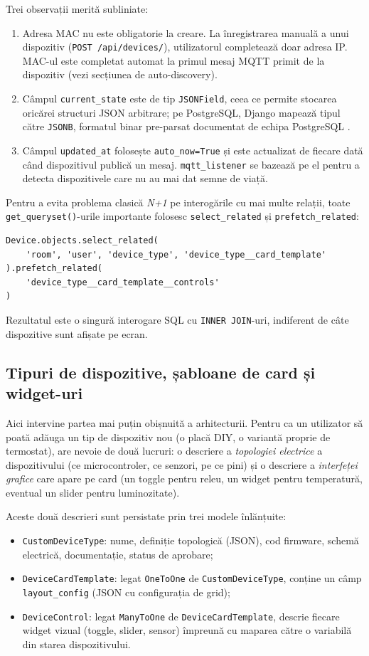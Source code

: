 Trei observații merită subliniate:
\begin{enumerate}
    \item Adresa MAC nu este obligatorie la creare. La înregistrarea manuală a unui dispozitiv (\texttt{POST /api/devices/}), utilizatorul completează doar adresa IP. MAC-ul este completat automat la primul mesaj MQTT primit de la dispozitiv (vezi secțiunea de auto-discovery).
    \item Câmpul \texttt{current\_state} este de tip \texttt{JSONField}, ceea ce permite stocarea oricărei structuri JSON arbitrare; pe PostgreSQL, Django mapează tipul către \texttt{JSONB}, formatul binar pre-parsat documentat de echipa PostgreSQL \cite{postgresql_jsonb_docs}.
    \item Câmpul \texttt{updated\_at} folosește \texttt{auto\_now=True} și este actualizat de fiecare dată când dispozitivul publică un mesaj. \texttt{mqtt\_listener} se bazează pe el pentru a detecta dispozitivele care nu au mai dat semne de viață.
\end{enumerate}

Pentru a evita problema clasică \textit{N+1} pe interogările cu mai multe relații, toate \texttt{get\_queryset()}-urile importante folosesc \texttt{select\_related} și \texttt{prefetch\_related}:
\begin{verbatim}
Device.objects.select_related(
    'room', 'user', 'device_type', 'device_type__card_template'
).prefetch_related(
    'device_type__card_template__controls'
)
\end{verbatim}
Rezultatul este o singură interogare SQL cu \texttt{INNER JOIN}-uri, indiferent de câte dispozitive sunt afișate pe ecran.

\subsection{Tipuri de dispozitive, șabloane de card și widget-uri}
Aici intervine partea mai puțin obișnuită a arhitecturii. Pentru ca un utilizator să poată adăuga un tip de dispozitiv nou (o placă DIY, o variantă proprie de termostat), are nevoie de două lucruri: o descriere a \emph{topologiei electrice} a dispozitivului (ce microcontroler, ce senzori, pe ce pini) și o descriere a \emph{interfeței grafice} care apare pe card (un toggle pentru releu, un widget pentru temperatură, eventual un slider pentru luminozitate).

Aceste două descrieri sunt persistate prin trei modele înlănțuite:
\begin{itemize}
    \item \texttt{CustomDeviceType}: nume, definiție topologică (JSON), cod firmware, schemă electrică, documentație, status de aprobare;
    \item \texttt{DeviceCardTemplate}: legat \texttt{OneToOne} de \texttt{CustomDeviceType}, conține un câmp \texttt{layout\_config} (JSON cu configurația de grid);
    \item \texttt{DeviceControl}: legat \texttt{ManyToOne} de \texttt{DeviceCardTemplate}, descrie fiecare widget vizual (toggle, slider, sensor) împreună cu maparea către o variabilă din starea dispozitivului.
\end{itemize}

